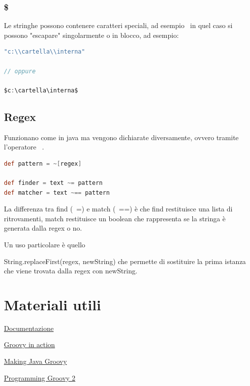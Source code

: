 \documentclass[11pt,a4paper]{book}
\begin{document}
\subsection{\$}
Le stringhe possono contenere caratteri speciali, ad esempio \, in quel caso si possono "escapare" singolarmente o in blocco, ad esempio:
\begin{lstlisting}[language = groovy]
"c:\\cartella\\interna"

// oppure

$c:\cartella\interna$
\end{lstlisting}

\section{Regex}
Funzionano come in java ma vengono dichiarate diversamente, ovvero tramite l'operatore ~.
\begin{lstlisting}[language = groovy]
def pattern = ~[regex]

def finder = text ~= pattern
def matcher = text ~== pattern
\end{lstlisting}
La differenza tra find (~=) e match (~==) è che find restituisce una lista di ritrovamenti, match restituisce un boolean che rappresenta se la stringa è generata dalla regex o no.

Un uso particolare è quello

String.replaceFirst(regex, newString) che permette di sostituire la prima istanza che viene trovata dalla regex con newString.
\chapter{Materiali utili}
\href{https://groovy-lang.org/}{Documentazione}

\href{https://www.manning.com/books/groovy-in-action-second-edition}{Groovy in action}

\href{https://www.manning.com/books/making-java-groovy}{Making Java Groovy}

\href{https://pragprog.com/titles/vslg2/programming-groovy-2/}{Programming Groovy 2}
\end{document}
